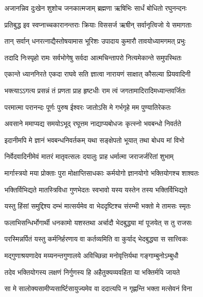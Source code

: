 \twolineshloka
{अजानन्निव दुःखेन शुशोच जनकात्मजाम्}
{ब्रह्मणा ऋषिभिः सार्धं बोधितो रघुनन्दनः} %

\twolineshloka
{प्रतिबुद्ध इव स्वप्नाच्चकारानन्तराः क्रियाः}
{विससर्ज ऋषीन् सर्वानृत्विजो ये समागताः} %

\twolineshloka
{तान् सर्वान् धनरत्नाद्यैस्तोषयामास भूरिशः}
{उपादाय कुमारौ तावयोध्यामगमत् प्रभुः} %

\twolineshloka
{तदादि निःस्पृहो रामः सर्वभोगेषु सर्वदा}
{आत्मचिन्तापरो नित्यमेकान्ते समुपस्थितः} %

\twolineshloka
{एकान्ते ध्याननिरते एकदा राघवे सति}
{ज्ञात्वा नारायणं साक्षात् कौसल्या प्रियवादिनी} %

\twolineshloka
{भक्त्याऽऽगत्य प्रसन्नं तं प्रणता प्राह हृष्टधीः}
{राम त्वं जगतामादिरादिमध्यान्तवर्जितः} %

\twolineshloka
{परमात्मा परानन्दः पूर्णः पुरुष ईश्वरः}
{जातोऽसि मे गर्भगृहे मम पुण्यातिरेकतः} %

\twolineshloka
{अवसाने ममाप्यद्य समयोऽभूद् रघूत्तम}
{नाद्याप्यबोधजः कृत्स्नो भवबन्धो निवर्तते} %

\twolineshloka
{इदानीमपि मे ज्ञानं भवबन्धनिवर्तकम्}
{यथा सङ्क्षेपतो भूयात् तथा बोधय मां विभो} %

\twolineshloka
{निर्वेदवादिनीमेवं मातरं मातृवत्सलः}
{दयालुः प्राह धर्मात्मा जराजर्जरितां शुभाम्} %

\twolineshloka
{मार्गास्त्रयो मया प्रोक्ताः पुरा मोक्षाप्तिसाधकाः}
{कर्मयोगो ज्ञानयोगो भक्तियोगश्च शाश्वतः} %

\twolineshloka
{भक्तिर्विभिद्यते मातस्त्रिविधा गुणभेदतः}
{स्वभावो यस्य यस्तेन तस्य भक्तिर्विभिद्यते} %

\twolineshloka
{यस्तु हिंसां समुद्दिश्य दम्भं मात्सर्यमेव वा}
{भेददृष्टिश्च संरम्भी भक्तो मे तामसः स्मृतः} %

\twolineshloka
{फलाभिसन्धिर्भोगार्थी धनकामो यशस्तथा}
{अर्चादौ भेदबुद्ध्या मां पूजयेत् स तु राजसः} %

\twolineshloka
{परस्मिन्नर्पितं यस्तु कर्मनिर्हरणाय वा}
{कर्तव्यमिति वा कुर्याद् भेदबुद्ध्या स सात्त्विकः} %

\twolineshloka
{मद्गुणाश्रयणादेव मय्यनन्तगुणालये}
{अविच्छिन्ना मनोवृत्तिर्यथा गङ्गाम्बुनोऽम्बुधौ} %

\twolineshloka
{तदेव भक्तियोगस्य लक्षणं निर्गुणस्य हि}
{अहैतुक्यव्यवहिता या भक्तिर्मयि जायते} %

\twolineshloka
{सा मे सालोक्यसामीप्यसार्ष्टिसायुज्यमेव वा}
{ददात्यपि न गृह्णन्ति भक्ता मत्सेवनं विना} %

